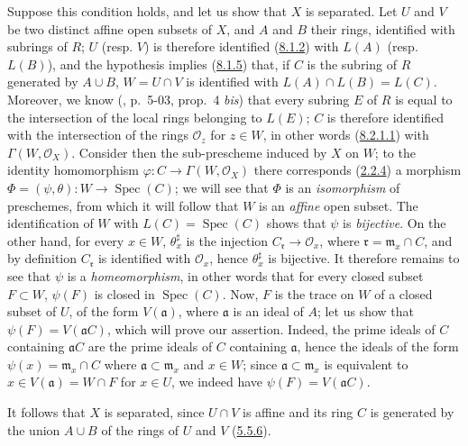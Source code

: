 Suppose this condition holds, and let us show that $X$ is separated. Let
$U$ and $V$ be two distinct affine open subsets of $X$, and $A$ and $B$ their
rings, identified with subrings of $R$; $U$ (resp. $V$) is therefore
identified (\hyperref[I.8.1.2]{8.1.2}) with $L(A)$ (resp. $L(B)$), and the
hypothesis implies (\hyperref[I.8.1.5]{8.1.5}) that, if $C$ is the subring
of $R$ generated by $A\cup B$, $W=U\cap V$ is identified with
$L(A)\cap L(B)=L(C)$. Moreover, we know
(\cite{I-1}, p.~5-03, prop.~4 \emph{bis}) that every subring $E$ of $R$ is
equal to the intersection of the local rings belonging to $L(E)$; $C$ is
therefore identified with the intersection of the rings $\mathscr{O}_z$ for
$z\in W$, in other words (\hyperref[I.8.2.1.1]{8.2.1.1}) with
$\Gamma(W,\mathscr{O}_X)$. Consider then the sub-prescheme induced by $X$
on $W$; to the identity homomorphism
$\varphi:C\to\Gamma(W,\mathscr{O}_X)$ there corresponds
(\hyperref[I.2.2.4]{2.2.4}) a morphism
$\Phi=(\psi,\theta):W\to\operatorname{Spec}(C)$; we will see that $\Phi$
is an \emph{isomorphism} of preschemes, from which it will follow that $W$ is
an \emph{affine} open subset. The identification of $W$ with
$L(C)=\operatorname{Spec}(C)$ shows that $\psi$ is \emph{bijective}. On the
other hand, for every $x\in W$, $\theta_x^\sharp$ is the injection
$C_\mathfrak r\to\mathscr{O}_x$, where
$\mathfrak r=\mathfrak m_x\cap C$, and by definition $C_\mathfrak r$ is
identified with $\mathscr{O}_x$, hence $\theta_x^\sharp$ is bijective. It
therefore remains to see that $\psi$ is a \emph{homeomorphism}, in other words
that for every closed subset $F\subset W$, $\psi(F)$ is closed in
$\operatorname{Spec}(C)$. Now, $F$ is the trace on $W$ of a closed subset of
$U$, of the form $V(\mathfrak a)$, where $\mathfrak a$ is an ideal of $A$;
let us show that $\psi(F)=V(\mathfrak a C)$, which will prove our assertion.
Indeed, the prime ideals of $C$ containing $\mathfrak a C$ are the prime
ideals of $C$ containing $\mathfrak a$, hence the ideals of the form
$\psi(x)=\mathfrak m_x\cap C$ where
$\mathfrak a\subset\mathfrak m_x$ and $x\in W$; since
$\mathfrak a\subset\mathfrak m_x$ is equivalent to
$x\in V(\mathfrak a)=W\cap F$ for $x\in U$, we indeed have
$\psi(F)=V(\mathfrak a C)$.

It follows that $X$ is separated, since $U\cap V$ is affine and its ring $C$
is generated by the union $A\cup B$ of the rings of $U$ and $V$
(\hyperref[I.5.5.6]{5.5.6}).

